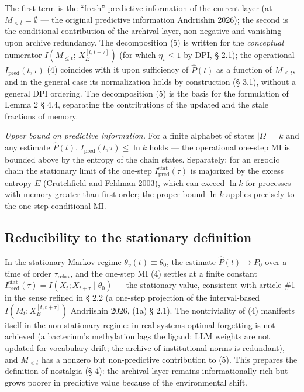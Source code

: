 \documentclass[pdflatex,sn-mathphys-ay]{sn-jnl}
\providecommand{\lt}{<}\providecommand{\gt}{>}
\begin{document}
The first term is the ``fresh'' predictive information of the current layer (at \(M_{\lt t} = \emptyset\) --- the original predictive information Andriishin 2026); the second is the conditional contribution of the archival layer, non-negative and vanishing upon archive redundancy. The decomposition (5) is written for the \emph{conceptual} numerator \(I(M_{\le t};\, X_E^{[t, t+\tau]})\) (for which \(\eta_v \le 1\) by DPI, § 2.1); the operational \(I_{\text{pred}}(t,\tau)\) (4) coincides with it upon sufficiency of \(\hat P(t)\) as a function of \(M_{\le t}\), and in the general case its normalization holds by construction (§ 3.1), without a general DPI ordering. The decomposition (5) is the basis for the formulation of Lemma 2 § 4.4, separating the contributions of the updated and the stale fractions of memory.



\emph{Upper bound on predictive information.} For a finite alphabet of states \(|\Omega| = k\) and any estimate \(\hat P(t)\), \(I_{\text{pred}}(t, \tau) \le \ln k\) holds --- the operational one-step MI is bounded above by the entropy of the chain states. Separately: for an ergodic chain the stationary limit of the one-step \(I_{\text{pred}}^{\text{stat}}(\tau)\) is majorized by the excess entropy \(E\) (Crutchfield and Feldman 2003), which can exceed \(\ln k\) for processes with memory greater than first order; the proper bound \(\ln k\) applies precisely to the one-step conditional MI.



\subsection{Reducibility to the stationary definition}\label{reducibility-to-the-stationary-definition}



In the stationary Markov regime \(\theta_v(t) \equiv \theta_0\), the estimate \(\hat P(t) \to P_0\) over a time of order \(\tau_{\text{relax}}\), and the one-step MI (4) settles at a finite constant \(I_{\text{pred}}^{\text{stat}}(\tau) = I(X_t; X_{t+\tau} \mid \theta_0)\) --- the stationary value, consistent with article \#1 in the sense refined in § 2.2 (a one-step projection of the interval-based \(I(M_t; X_E^{[t,t+\tau]})\) Andriishin 2026, (1a) § 2.1). The nontriviality of (4) manifests itself in the non-stationary regime: in real systems optimal forgetting is not achieved (a bacterium's methylation lags the ligand; LLM weights are not updated for vocabulary drift; the archive of institutional norms is redundant), and \(M_{\lt t}\) has a nonzero but non-predictive contribution to (5). This prepares the definition of nostalgia (§ 4): the archival layer remains informationally rich but grows poorer in predictive value because of the environmental shift.
\end{document}
